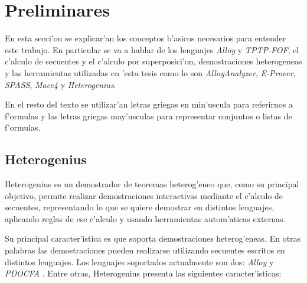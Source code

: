 \chapter{Preliminares}

En esta secci'on se explicar'an los conceptos b'asicos necesarios para entender este trabajo. En particular se va a hablar de los lenguajes \textit{Alloy} y \textit{TPTP-FOF}, el c'alculo de secuentes y el c'alculo por superposici'on, demostraciones heterogeneas y las herramientas utilizadas en 'esta tesis como lo son \textit{AlloyAnalyzer}, \textit{E-Prover}, \textit{SPASS}, \textit{Mace4} y \textit{Heterogenius}. 

En el resto del texto se utilizar'an letras griegas en min'uscula para referirnos a f'ormulas y las letras griegas may'usculas para representar conjuntos o listas de f'ormulas.








\section{Heterogenius}
\label{section:Heterogenius}

Heterogenius \cite{heterogenius} es un demostrador de teoremas heterog'eneo que, como su principal objetivo, permite realizar demostraciones interactivas mediante el c'alculo de secuentes, representando lo que se quiere demostrar en distintos lenguajes, aplicando reglas de ese c'alculo y usando herramientas autom'aticas externas. 

Su principal caracter'istica es que soporta demostraciones heterog'eneas. En otras palabras las demostraciones pueden realizarse utilizando secuentes escritos en distintos lenguajes. Los lenguajes soportados actualmente son dos: \textit{Alloy} \cite{alloy} y \textit{PDOCFA} \cite{pdocfa}. Entre otras, Heterogenius presenta las siguientes caracter'isticas:

